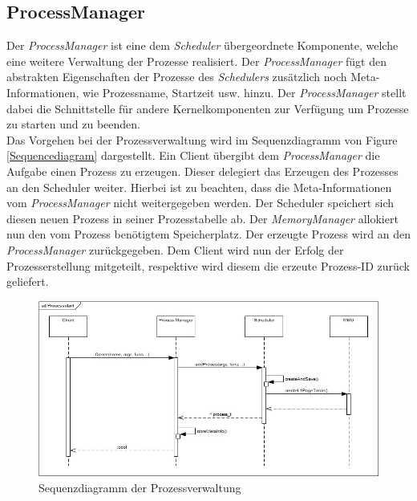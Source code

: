 \subsection{ProcessManager}
\label{secProcessManager}
Der \textit{ProcessManager} ist eine dem \textit{Scheduler} übergeordnete Komponente, welche eine weitere Verwaltung der Prozesse realisiert. Der \textit{ProcessManager} fügt den abstrakten Eigenschaften der Prozesse des \textit{Schedulers} zusätzlich noch Meta-Informationen, wie Prozessname, Startzeit usw. hinzu. Der \textit{ProcessManager} stellt dabei die Schnittstelle für andere Kernelkomponenten zur Verfügung um Prozesse zu starten und zu beenden.\\

Das Vorgehen bei der Prozessverwaltung wird im Sequenzdiagramm von Figure \ref{Sequencediagram} dargestellt. Ein Client übergibt dem \textit{ProcessManager} die Aufgabe einen Prozess zu erzeugen. Dieser delegiert das Erzeugen des Prozesses an den Scheduler weiter. Hierbei ist zu beachten, dass die Meta-Informationen vom \textit{ProcessManager} nicht weitergegeben werden. Der Scheduler speichert sich diesen neuen Prozess in seiner Prozesstabelle ab. Der \textit{MemoryManager} allokiert nun den vom Prozess benötigtem Speicherplatz. Der erzeugte Prozess wird an den \textit{ProcessManager} zurückgegeben. Dem Client wird nun der Erfolg der Prozesserstellung mitgeteilt, respektive wird diesem die erzeute Prozess-ID zurück geliefert.

\begin{figure}[H]
	\includegraphics[scale=0.70]{chapters/processmanagement/figures/processmanagement-sequence-diagram}
	\caption{Sequenzdiagramm der Prozessverwaltung}
	\label{fig:Sequencediagram}
\end{figure}

\pagebreak 